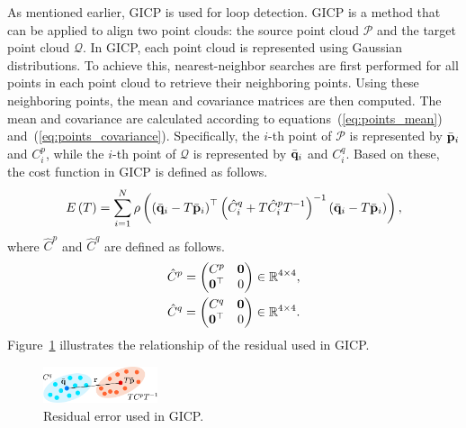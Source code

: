 As mentioned earlier, GICP is used for loop detection.
GICP is a method that can be applied to align two point clouds: the source point cloud $\mathcal{P}$ and the target point cloud $\mathcal{Q}$.
In GICP, each point cloud is represented using Gaussian distributions.
To achieve this, nearest-neighbor searches are first performed for all points in each point cloud to retrieve their neighboring points.
Using these neighboring points, the mean and covariance matrices are then computed.
The mean and covariance are calculated according to equations~(\ref{eq:points_mean}) and~(\ref{eq:points_covariance}).
Specifically, the $i$-th point of $\mathcal{P}$ is represented by $\bar{ {\bf p} }_{i}$ and $C_{i}^{p}$, while the $i$-th point of $\mathcal{Q}$ is represented by $\bar{ {\bf q} }_{i}$ and $C_{i}^{q}$.
Based on these, the cost function in GICP is defined as follows.
%
\begin{align}
  E \left( T \right) = \sum_{i=1}^{N} \rho \left( \left( \bar{ {\bf q} }_{i} - T \bar{ {\bf p} }_{i} \right)^{\top} \left( \hat{C}_{i}^{q} + T \hat{C}_{i}^{p} T^{-1} \right)^{-1} \left( \bar{ {\bf q} }_{i} - T \bar{ {\bf p} }_{i} \right) \right),
  \label{eq:gicp_cost_function}
\end{align}
%
where $\hat{C}^{p}$ and $\hat{C}^{q}$ are defined as follows.
%
\begin{align}
  \begin{gathered}
    \hat{C}^{p} = \left( \begin{matrix}
      C^{p}          & {\bf 0} \\
      {\bf 0}^{\top} & 0
    \end{matrix} \right) \in \mathbb{R}^{4 \times 4}, \\
%
    \hat{C}^{q} = \left( \begin{matrix}
      C^{q}          & {\bf 0} \\
      {\bf 0}^{\top} & 0
    \end{matrix} \right) \in \mathbb{R}^{4 \times 4}.
  \end{gathered}
\end{align}
%
Figure~\ref{fig:gicp_residual} illustrates the relationship of the residual used in GICP.

\begin{figure}[!t]
  \centering
  \includegraphics[width=0.3\textwidth]{../figs/gicp_residual.pdf}
  \caption{Residual error used in GICP.}
  \label{fig:gicp_residual}
\end{figure}

